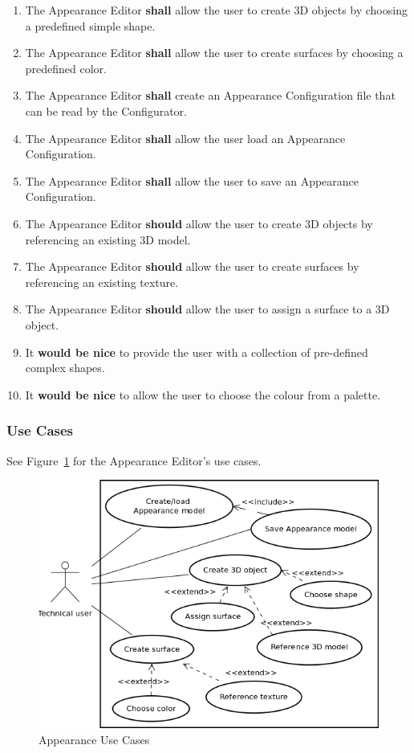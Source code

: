 \begin{enumerate}
  \item The Appearance Editor \textbf{shall} allow the user to create 3D objects by choosing a predefined simple shape.
  \item The Appearance Editor \textbf{shall} allow the user to create surfaces by choosing a predefined color.
  \item The Appearance Editor \textbf{shall} create an Appearance Configuration file that can be read by the Configurator.
  \item The Appearance Editor \textbf{shall} allow the user load an Appearance Configuration.
  \item The Appearance Editor \textbf{shall} allow the user to save an Appearance Configuration.
  \item The Appearance Editor \textbf{should} allow the user to create 3D objects by referencing an existing 3D model.
  \item The Appearance Editor \textbf{should} allow the user to create surfaces by referencing an existing texture.
  \item The Appearance Editor \textbf{should} allow the user to assign a surface to a 3D object.
  \item It \textbf{would be nice} to provide the user with a collection of pre-defined complex shapes.
  \item It \textbf{would be nice} to allow the user to choose the colour from a palette.
\end{enumerate}

\subsubsection{Use Cases}

See Figure~\ref{fig:appearance_use_cases} for the Appearance Editor's use cases.

\begin{figure}[htp]
\begin{center}
  \includegraphics[scale=0.5]{image/uc_appearance.png}
  \caption{Appearance Use Cases}
  \label{fig:appearance_use_cases}
\end{center}
\end{figure}

